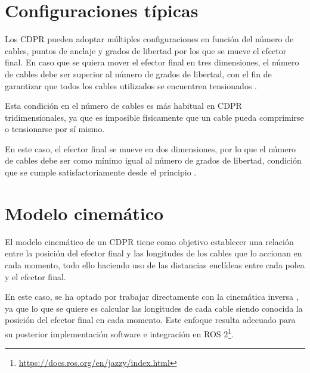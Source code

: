\section{Configuraciones típicas}
\label{sec:segundaseccion}

Los CDPR pueden adoptar múltiples configuraciones en función del número de cables, puntos de anclaje y grados de libertad por los que se mueve el efector final. En caso que se quiera mover el efector final en tres dimensiones, el número de cables debe ser superior al número de grados de libertad, con el fin de garantizar que todos los cables utilizados se encuentren tensionados \cite{aref2008workspace,aref2009kinematics}.

\vspace{0.25cm}

Esta condición en el número de cables es más habitual en CDPR tridimensionales, ya que es imposible físicamente que un cable pueda comprimirse \cite{behzadipour2005stiffness} o tensionarse por sí mismo.

\vspace{0.25cm}

En este caso, el efector final se mueve en dos dimensiones, por lo que el número de cables debe ser como mínimo igual al número de grados de libertad, condición que se cumple satisfactoriamente desde el principio \cite{aref2008workspace}.

\section{Modelo cinemático}
\label{sec:segundaseccion}

El modelo cinemático de un CDPR tiene como objetivo establecer una relación entre la posición del efector final y las longitudes de los cables que lo accionan \cite{aref2009kinematics} en cada momento, todo ello haciendo uso de las distancias euclídeas entre cada polea y el efector final.

\vspace{0.25cm}

En este caso, se ha optado por trabajar directamente con la cinemática inversa \cite{aref2009kinematics}, ya que lo que se quiere es calcular las longitudes de cada cable siendo conocida la posición del efector final en cada momento. Este enfoque resulta adecuado para su posterior implementación software e integración en ROS 2\footnote{\url{https://docs.ros.org/en/jazzy/index.html}}.

\vspace{0.25cm}

